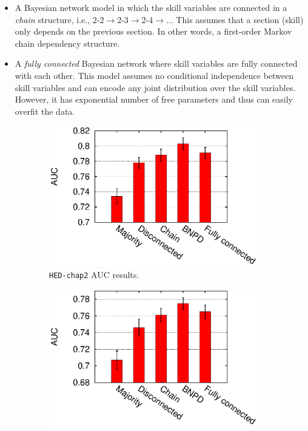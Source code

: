 \documentclass{edm_template}
\begin{document}
{\begin{itemize}[topsep=2pt,parsep=0pt,partopsep=0pt]
		This model assumes that the skill variables are marginally independent of each other. Most existing knowledge tracing approaches make this assumption.
		\item A Bayesian network model in which the skill variables are connected in a \emph{chain} structure, i.e., 2-2$\rightarrow$2-3$\rightarrow$2-4$\rightarrow\dots$
		This assumes that a section (skill) only depends on the previous section.
		In other words, a first-order Markov chain dependency structure.
		\item A \emph{fully connected} Bayesian network where skill variables are fully connected with each other.
		This model assumes no conditional independence between skill variables and can encode any joint distribution over the skill variables.
		However, it has exponential number of free parameters and thus can easily overfit the data.
	\end{itemize}
	\begin{figure}[!ht]
		\centering
		\begin{subfigure}[b]{0.48\linewidth}
			\centering
			\includegraphics[width=1.1\linewidth]{figures/hed_chap2_30_auc.eps}
			\caption{\texttt{HED-chap2} AUC results. }
			\label{fig:auc-chap2}
		\end{subfigure}
		\begin{subfigure}[b]{0.48\linewidth}
			\centering
			\includegraphics[width=1.1\linewidth]{figures/hed_chap3_33_auc.eps}

\end{subfigure}
\end{figure}}
\end{document}
